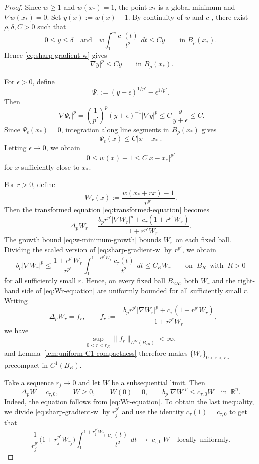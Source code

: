 \documentclass[10pt,a4paper]{amsart}
\newcommand{\R}{\mathbb R}
\newcommand{\dd}{\,d}
\begin{document}
\begin{proof}
Since $w\ge1$ and $w(x_*)=1$, the point $x_*$ is a
global minimum and $\nabla w(x_*)=0$.
Set $y(x):=w(x)-1.$
By continuity of $w$ and $c_\tau$, there exist $\rho,\delta,C>0$ such that
$$
0\le y\le\delta \quad\text{and}\quad
w\int_1^w\frac{c_\tau(t)}{t^2}\,\dd t \le Cy
\qquad\text{in }B_\rho(x_*).
$$
Hence \eqref{eq:sharp-gradient-w} gives
$$
|\nabla y|^p\le Cy \qquad\text{in }B_\rho(x_*).
$$

For $\epsilon>0$, define
$$
\Psi_\epsilon := (y+\epsilon)^{1/p'} -\epsilon^{1/p'}.
$$
Then
$$
|\nabla\Psi_\epsilon|^p
=\left(\frac1{p'}\right)^p (y+\epsilon)^{-1}|\nabla y|^p \le C\frac{y}{y+\epsilon} \le C.
$$
Since $\Psi_\epsilon(x_*)=0$, integration along line
segments in $B_\rho(x_*)$ gives
$$
\Psi_\epsilon(x)\le C|x-x_*|.
$$
Letting $\epsilon\to 0$, we obtain
\begin{equation}\label{eq:w-minimum-growth}
    0\le w(x)-1\le C|x-x_*|^{p'}
\end{equation}
for $x$ sufficiently close to $x_*$.

For $r>0$, define
$$
W_r(x):=\frac{w(x_*+rx)-1}{r^{p'}}.
$$
Then the transformed equation \eqref{eq:transformed-equation} becomes
\begin{equation}\label{eq:Wr-equation}
 \Delta_pW_r  =\frac{b_pr^{p'}|\nabla W_r|^p
+c_\tau(1+r^{p'}W_r)}{1+r^{p'}W_r}.
\end{equation}
The growth bound \eqref{eq:w-minimum-growth} bounds $W_r$ on each fixed ball.  Dividing  the scaled version of \eqref{eq:sharp-gradient-w} by $r^{p'}$, we obtain
\begin{equation}\label{eq:W-upper}
b_p  |\nabla W_r|^p \le \frac{1+r^{p'}W_r}{r^{p'}}\int_1^{1+r^{p'}W_r}\frac{c_\tau(t)}{t^2}\, \dd t \le C_R W_r     \qquad\text{on }\  B_R \ \text{ with }\  R>0
\end{equation}
for all sufficiently small $r$.
Hence, on every fixed ball $B_{2R}$, both $W_r$ and the right-hand side of \eqref{eq:Wr-equation} are uniformly bounded for all sufficiently small $r$.  Writing
$$
-\Delta_pW_r=f_r,
\qquad f_r:=-\frac{b_pr^{p'}|\nabla W_r|^p
+c_\tau(1+r^{p'}W_r)}{1+r^{p'}W_r},
$$
we have
$$
\sup_{0<r<r_R}\|f_r\|_{L^\infty(B_{2R})}<\infty,
$$
and Lemma~\ref{lem:uniform-C1-compactness} therefore makes
$\{W_r\}_{0<r<r_R}$ precompact in $C^1(B_R)$.

Take a sequence $r_j\to 0$ and let $W$ be a subsequential limit.  Then
\begin{equation}\label{eq:tangent-limit-system}
 \Delta_p W=c_{\tau,0},
 \qquad  W\ge0,  \qquad  W(0)=0,
 \qquad  b_p|\nabla W|^p\le c_{\tau,0}W  \quad \text{in } \ \R^n.
\end{equation}
Indeed, the equation follows from \eqref{eq:Wr-equation}. To obtain the last inequality, we divide \eqref{eq:sharp-gradient-w} by $r_j^{p'}$ and use the identity $c_\tau(1)=c_{\tau,0}$ to get that
$$
 \frac{1}{r_j^{p'}}\bigl(1 + r_j^{p'} W_{r_j}\bigr)
 \int_1^{1 + r_j^{p'} W_{r_j}} \frac{c_\tau(t)}{t^2}\,\dd t  \;\to\;  c_{\tau,0}\,W  \quad \text{locally uniformly.}
$$


\end{proof}
\end{document}
